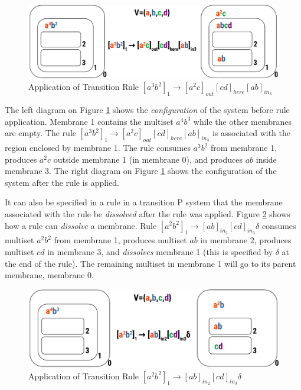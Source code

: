 \documentclass{article}
\begin{document}
\begin{figure}[H]
\begin{center}
\includegraphics[scale=0.55]{figures/zzz-transition-rule.pdf}
\caption{Application of Transition Rule $[a^3b^2]_1 \rightarrow [a^2c]_{out}[cd]_{here}[ab]_{in_3}$}
\label{fig:trans-rule}
\end{center}
\end{figure}

The left diagram on Figure \ref{fig:trans-rule} shows the \textit{configuration} of the system
before rule application. Membrane 1 contains the multiset $a^4b^3$ while the other membranes are 
empty. The rule $[a^3b^2]_1 \rightarrow [a^2c]_{out}[cd]_{here}[ab]_{in_3}$ is associated with the
region  enclosed by membrane 1. The rule consumes $a^3b^2$ from membrane 1, produces $a^2c$ outside 
membrane 1 (in membrane 0), and produces $ab$ inside membrane 3. The right diagram on Figure 
\ref{fig:trans-rule} shows the configuration of the system after the rule is applied.

It can also be specified in a rule in a transition P system that the membrane associated with the 
rule be \textit{dissolved} after the rule was applied. Figure \ref{fig:trans-rule2} shows how a rule
can \textit{dissolve} a membrane. Rule $[a^2b^2]_1 \rightarrow [ab]_{in_2}[cd]_{in_3}\delta$ 
consumes multiset $a^2b^2$ from membrane 1, produces multiset $ab$ in membrane $2$, produces 
multiset $cd$ in membrane 3, and \textit{dissolves} membrane 1 (this is specified by $\delta$ at the
end of the rule). The remaining multiset in membrane 1 will go to its parent membrane, membrane 0.

\begin{figure}[H]
\begin{center}
\includegraphics[scale=0.55]{figures/zzz-transition-rule2.pdf}
\caption{Application of Transition Rule $[a^2b^2]_1 \rightarrow [ab]_{in_2}[cd]_{in_3}\delta$}
\label{fig:trans-rule2}
\end{center}
\end{figure}
\end{document}
